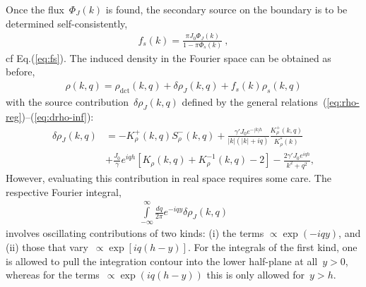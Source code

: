 \documentclass[preprint,aps,eqsecnum, prb]{revtex4-1}
\newcommand{\fplus}[1]{{#1}^{+}}
\newcommand{\fminus}[1]{{#1}^{-}}
\renewcommand{\Im}{\mathop{\mathrm{Im}}\nolimits}
\newcommand{\dct}[1]{{#1}_\mathrm{dct}}
\begin{document}
Once the flux~$\Phi_J(k)$ is found, 
the secondary source on the boundary is to be determined self-consistently, 
\begin{align}
\label{eq:fs-J}
    f_{s}(k) = \frac{\pi J_0 \Phi_J(k)}{1 - \pi \Phi_s(k)}\ , 
\end{align} 
cf Eq.(\ref{eq:fs}). The induced density in the Fourier space can be 
obtained as before, 
\begin{align}
\rho(k, q) = \dct{\rho}(k, q) +  \delta\rho_J(k, q) + f_s(k) \rho_s(k, q)
\end{align}
with the source contribution~$\delta\rho_J(k, q)$ 
defined by the general relations~(\ref{eq:rho-reg})--(\ref{eq:drho-inf}):
\begin{align}
\delta\rho_{J}(k, q) &= - \fplus{K}_\rho(k, q) \fminus{S}_\rho(k, q)
+ \frac{\gamma' J_0 e^{-|k|h}}{|k|(|k| + iq)} 
  \frac{\fplus{K}_\rho(k, q)}{K_\rho^\ast(k)}  \\ \nonumber
&+ \frac{J_0}{\gamma} e^{iqh} 
\left[K_\rho(k, q) + K_\rho^{-1}(k, q) - 2\right] 
- \frac{2\gamma' J_0 e^{iqh}}{k^2 + q^2} , 
\end{align}
However, evaluating this contribution in real space requires some care.
The respective Fourier integral, 
\begin{align}
\int\limits_{-\infty}^{\infty}\frac{dq}{2\pi} e^{-iqy} \delta\rho_{J}(k, q) 
\end{align}
involves oscillating contributions of two kinds: (i) the terms
$\propto \exp(-iqy)$, and (ii) those that vary~$\propto \exp\left[i q (h - y)\right]$. 
For the integrals of the first kind, one is allowed to pull the integration
contour into the lower half-plane at all~$y > 0$, whereas for the 
terms~$\propto \exp(i q (h - y))$ this is only allowed for~$y > h$.
\end{document}
